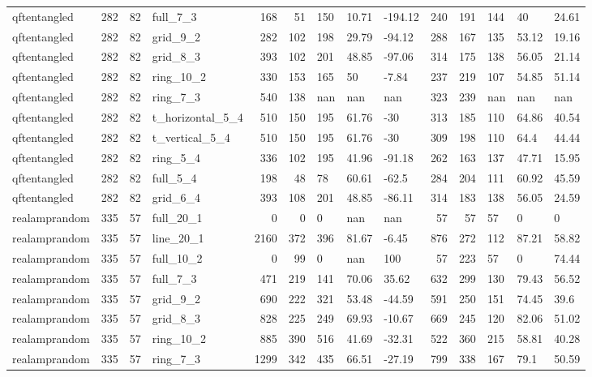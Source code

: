 \begin{longtable}{lrrlrrlllrrlll}
qftentangled & 282 & 82 & full\_7\_3 & 168 & 51 & 150 & 10.71 & -194.12 & 240 & 191 & 144 & 40 & 24.61 \\
qftentangled & 282 & 82 & grid\_9\_2 & 282 & 102 & 198 & 29.79 & -94.12 & 288 & 167 & 135 & 53.12 & 19.16 \\
qftentangled & 282 & 82 & grid\_8\_3 & 393 & 102 & 201 & 48.85 & -97.06 & 314 & 175 & 138 & 56.05 & 21.14 \\
qftentangled & 282 & 82 & ring\_10\_2 & 330 & 153 & 165 & 50 & -7.84 & 237 & 219 & 107 & 54.85 & 51.14 \\
qftentangled & 282 & 82 & ring\_7\_3 & 540 & 138 & nan & nan & nan & 323 & 239 & nan & nan & nan \\
qftentangled & 282 & 82 & t\_horizontal\_5\_4 & 510 & 150 & 195 & 61.76 & -30 & 313 & 185 & 110 & 64.86 & 40.54 \\
qftentangled & 282 & 82 & t\_vertical\_5\_4 & 510 & 150 & 195 & 61.76 & -30 & 309 & 198 & 110 & 64.4 & 44.44 \\
qftentangled & 282 & 82 & ring\_5\_4 & 336 & 102 & 195 & 41.96 & -91.18 & 262 & 163 & 137 & 47.71 & 15.95 \\
qftentangled & 282 & 82 & full\_5\_4 & 198 & 48 & 78 & 60.61 & -62.5 & 284 & 204 & 111 & 60.92 & 45.59 \\
qftentangled & 282 & 82 & grid\_6\_4 & 393 & 108 & 201 & 48.85 & -86.11 & 314 & 183 & 138 & 56.05 & 24.59 \\
realamprandom & 335 & 57 & full\_20\_1 & 0 & 0 & 0 & nan & nan & 57 & 57 & 57 & 0 & 0 \\
realamprandom & 335 & 57 & line\_20\_1 & 2160 & 372 & 396 & 81.67 & -6.45 & 876 & 272 & 112 & 87.21 & 58.82 \\
realamprandom & 335 & 57 & full\_10\_2 & 0 & 99 & 0 & nan & 100 & 57 & 223 & 57 & 0 & 74.44 \\
realamprandom & 335 & 57 & full\_7\_3 & 471 & 219 & 141 & 70.06 & 35.62 & 632 & 299 & 130 & 79.43 & 56.52 \\
realamprandom & 335 & 57 & grid\_9\_2 & 690 & 222 & 321 & 53.48 & -44.59 & 591 & 250 & 151 & 74.45 & 39.6 \\
realamprandom & 335 & 57 & grid\_8\_3 & 828 & 225 & 249 & 69.93 & -10.67 & 669 & 245 & 120 & 82.06 & 51.02 \\
realamprandom & 335 & 57 & ring\_10\_2 & 885 & 390 & 516 & 41.69 & -32.31 & 522 & 360 & 215 & 58.81 & 40.28 \\
realamprandom & 335 & 57 & ring\_7\_3 & 1299 & 342 & 435 & 66.51 & -27.19 & 799 & 338 & 167 & 79.1 & 50.59 \\

\end{longtable}
